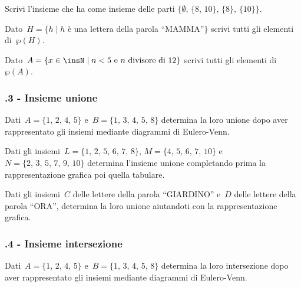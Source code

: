 \begin{esercizio}
 \label{ese:7.4}
 Scrivi l'insieme che ha come insieme delle parti
$\{\emptyset\text{, }\{\text{8, 10}\}\text{, }\{8\}\text{, }\{10\}\}$.
\end{esercizio}

\begin{esercizio}
 \label{ese:7.5}
Dato~$H=\{h\mid h$ è una lettera della parola ``MAMMA''$\}$ scrivi
tutti gli elementi di~$\wp (H)$.
\end{esercizio}

\begin{esercizio}
 \label{ese:7.6}
 Dato~$A=\{x\in\insN\mid n<5\text{ e }n\text{ divisore di~12}\}$ scrivi tutti gli elementi di
$\wp (A)$.
\end{esercizio}

\subsubsection*{\thechapter.3 - Insieme unione}
\begin{esercizio}
 \label{ese:7.7}
Dati~$A=\{\text{1, 2, 4, 5}\}$ e~$B=\{\text{1, 3, 4, 5, 8}\}$ determina la loro unione dopo
aver rappresentato gli insiemi mediante diagrammi di Eulero-Venn.
 \end{esercizio}

\begin{esercizio}
 \label{ese:7.8}
 Dati gli insiemi~$L=\{\text{1, 2, 5, 6, 7, 8}\}$, $M=\{\text{4, 5, 6, 7, 10}\}$ e~$N=\{\text{2, 3, 5, 7, 9, 10}\}$
determina l'insieme unione completando prima la rappresentazione
grafica poi quella tabulare.
\begin{center}
 
\end{center}
\end{esercizio}

\begin{esercizio}
 \label{ese:7.9}
Dati gli insiemi~$C$ delle lettere della parola ``GIARDINO'' e~$D$ delle lettere della
parola ``ORA'', determina la loro unione aiutandoti con la rappresentazione grafica.
 \end{esercizio}

\subsubsection*{\thechapter.4 - Insieme intersezione}
 \begin{esercizio}
 \label{ese:7.10}
Dati~$A=\{\text{1, 2, 4, 5}\}$ e~$B=\{\text{1, 3, 4, 5, 8}\}$ determina la loro
intersezione dopo aver rappresentato gli insiemi mediante diagrammi di
Eulero-Venn.
\end{esercizio}

